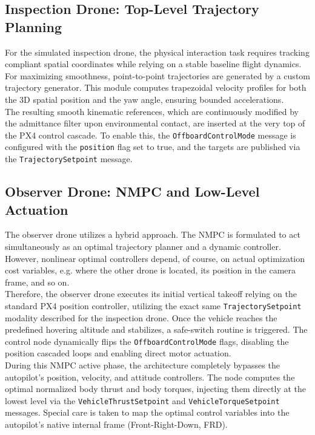 \subsection{Inspection Drone: Top-Level Trajectory Planning}
For the simulated inspection drone, the physical interaction task requires tracking compliant spatial coordinates while relying on a stable baseline flight dynamics. For maximizing smoothness, point-to-point trajectories are generated by a custom trajectory generator. This module computes trapezoidal velocity profiles for both the 3D spatial position and the yaw angle, ensuring bounded accelerations.
\\The resulting smooth kinematic references, which are continuously modified by the admittance filter upon environmental contact, are inserted at the very top of the PX4 control cascade. To enable this, the \texttt{OffboardControlMode} message is configured with the \texttt{position} flag set to true, and the targets are published via the \texttt{TrajectorySetpoint} message.

\subsection{Observer Drone: NMPC and Low-Level Actuation}
The observer drone utilizes a hybrid approach. The NMPC is formulated to act simultaneously as an optimal trajectory planner and a dynamic controller. However, nonlinear optimal controllers depend, of course, on actual optimization cost variables, e.g. where the other drone is located, its position in the camera frame, and so on. 
\\Therefore, the observer drone executes its initial vertical takeoff relying on the standard PX4 position controller, utilizing the exact same \texttt{TrajectorySetpoint} modality described for the inspection drone. Once the vehicle reaches the predefined hovering altitude and stabilizes, a safe-switch routine is triggered. The control node dynamically flips the \texttt{OffboardControlMode} flags, disabling the position cascaded loops and enabling direct motor actuation.
\\During this NMPC active phase, the architecture completely bypasses the autopilot's position, velocity, and attitude controllers. The node computes the optimal normalized body thrust and body torques, injecting them directly at the lowest level via the \texttt{VehicleThrustSetpoint} and \texttt{VehicleTorqueSetpoint} messages. Special care is taken to map the optimal control variables into the autopilot's native internal frame (Front-Right-Down, FRD).

